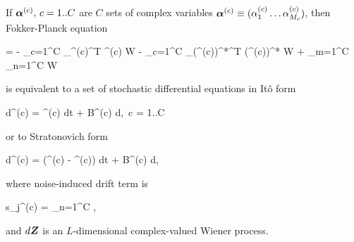 \begin{theorem}
\label{thm:wigner-bec:fpe:mc-fpe-sde}
	If $\boldsymbol{\alpha}^{(c)},\, c = 1..C$ are $C$ sets of complex variables $\boldsymbol{\alpha}^{(c)} \equiv (\alpha_1^{(c)} \ldots \alpha_{M_c}^{(c)})$,
	then Fokker-Planck equation
	\begin{eqn*}
		= - \sum_{c=1}^C \bpartial_{\balpha^{(c)}}^T \avec^{(c)} W
		- \sum_{c=1}^C \bpartial_{(\balpha^{(c)})^*}^T (\avec^{(c)})^* W
		+ \sum_{m=1}^C \sum_{n=1}^C
			 W
	\end{eqn*}
	is equivalent to a set of stochastic differential equations in It\^{o} form
	\begin{eqn*}
		d\balpha^{(c)} = \avec^{(c)} dt + B^{(c)} d\Zvec,\, c = 1..C
	\end{eqn*}
	or to Stratonovich form
	\begin{eqn*}
		d\balpha^{(c)} = (\avec^{(c)} - \svec^{(c)}) dt + B^{(c)} d\Zvec,
	\end{eqn*}
	where noise-induced drift term is
	\begin{eqn*}
		s_j^{(c)} = \sum_{n=1}^C
			\Trace{ (B^{(n)})^H \bpartial_{(\balpha^{(n)})^*} \evec_j^T B^{(c)} },
	\end{eqn*}
	and $d\boldsymbol{Z}$ is an $L$-dimensional complex-valued Wiener process.
\end{theorem}
